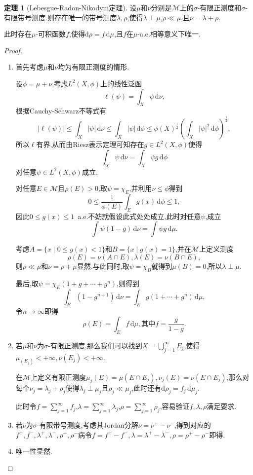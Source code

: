 \documentclass{ctexart}
\theoremstyle{definition}
\newtheorem{theorem}{定理}
\theoremstyle{remark}
\begin{document}
	\begin{theorem}[Lebesgue-Radon-Nikodym定理]
		设$\mu$和$\nu$分别是$\mathcal{M}$上的$\sigma$-有限正测度和$\sigma$-有限带号测度.则存在唯一的带号测度$\lambda,\rho$,使得$\lambda\perp\mu$,$\rho\ll\mu$,且$\nu=\lambda+\rho$.
		
		此时存在$\mu$-可积函数$f$,使得$\mathrm{d}\rho=f\,\mathrm{d}\mu$,且$f$在$\mu$-a.e.相等意义下唯一.
	\end{theorem}
	\begin{proof}
		\begin{enumerate}
			\item 首先考虑$\mu$和$\nu$均为有限正测度的情形.
			
			设$\phi=\mu+\nu$,考虑$L^2(X,\phi)$上的线性泛函
			$$\ell(\psi)=\int_X{\psi\,\mathrm{d}\nu},$$
			根据Cauchy-Schwarz不等式有
			$$|\ell(\psi)|\le\int_X{|\psi|\,\mathrm{d}\nu}
			\le\int_X{|\psi|\,\mathrm{d}\phi}
			\le\phi(X)^\frac{1}{2}\left(\int_X{|\psi|^2\,\mathrm{d}\phi}\right)^\frac{1}{2},$$
			所以$\ell$有界,从而由Riesz表示定理可知存在$g\in L^2(X,\phi)$使得
			$$\int_X{\psi\,\mathrm{d}\nu}=\int_X{\psi g\,\mathrm{d}\phi}$$
			对任意$\psi\in L^2(X,\phi)$成立.
			
			对任意$E\in\mathcal{M}$且$\rho(E)>0$,取$\psi=\chi_E$,并利用$\nu\le\phi$得到
			$$0\le\frac{1}{\phi(E)}\int_E{g(x)\,\mathrm{d}\phi}\le 1,$$
			因此$0\le g(x)\le 1$\ a.e.不妨就假设此式处处成立,此时对任意$\psi$,成立
			$$\int{\psi(1-g)\,\mathrm{d}\nu}=\int{\psi g\,\mathrm{d}\mu}.$$
			
			考虑$A=\{x\mid 0\le g(x)<1\}$和$B=\{x\mid g(x)=1\}$,并在$\mathcal{M}$上定义测度
			$$\rho(E)=\nu(A\cap E),\lambda(E)=\nu(B\cap E),$$
			则$\rho\ll\mu$和$\nu=\rho+\mu$显然.与此同时,取$\psi=\chi_B$就得到$\mu(B)=0$,所以$\lambda\perp\mu$.
			
			最后,取$\psi=\chi_E(1+g+\cdots+g^n)$,则得到
			$$\int_E{(1-g^{n+1})\,\mathrm{d}\nu}=\int_E{g(1+\cdots+g^n)\,\mathrm{d}\mu},$$
			令$n\to\infty$即得
			$$\rho(E)=\int_E{f\,\mathrm{d}\mu},\mbox{其中}f=\frac{g}{1-g}.$$
			
			\item 若$\mu$和$\nu$为$\sigma$-有限正测度,那么我们可以找到$X=\bigcup_{j=1}^\infty{E_j}$,使得$\mu_(E_j)<+\infty,\nu(E_j)<+\infty$.
			
			在$\mathcal{M}$上定义有限正测度$\mu_j(E)=\mu(E\cap E_j),\nu_j(E)=\nu(E\cap E_j)$,那么对每个$\nu_j=\lambda_j+\rho_j$使得$\lambda_j\perp\mu_j$且$\rho_j\ll\mu_j$,此时还有$\mathrm{d}\rho_j=f_j\,\mathrm{d}\mu_j$.
			
			此时令$f=\sum_{j=1}^\infty{f_j}$,$\lambda=\sum_{j=1}^\infty{\lambda_j}$,$\rho=\sum_{j=1}^\infty{\rho_j}$,容易验证$f,\lambda,\rho$满足要求.
			
			\item 若$\nu$为$\sigma$-有限带号测度,考虑其Jordan分解$\nu=\nu^+-\nu^-$,得到对应的$f^+,f^-,\lambda^+,\lambda^-,\rho^+,\rho^-$病令$f=f^+-f^-,\lambda=\lambda^+-\lambda^-,\rho=\rho^+-\rho^-$即得.
			
			\item 唯一性显然.
		\end{enumerate}
	\end{proof}
	
\end{document}
